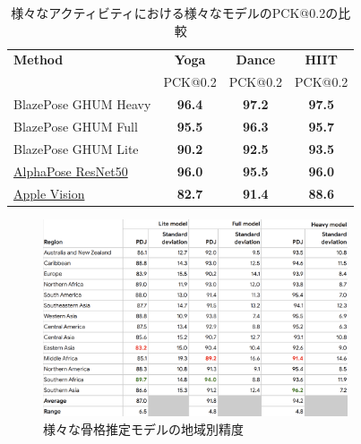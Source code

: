   \begin{table}[ht]
    \centering
    \begin{tabular}{|l|c|c|c|}
    \hline
    \textbf{Method} & \textbf{Yoga} & \textbf{Dance} & \textbf{HIIT} \\
                    & PCK@0.2       & PCK@0.2        & PCK@0.2       \\ 
    \hline
    BlazePose GHUM Heavy                                                      & \textbf{96.4} & \textbf{97.2} & \textbf{97.5} \\
    BlazePose GHUM Full                                                       & \textbf{95.5} & \textbf{96.3} & \textbf{95.7} \\
    BlazePose GHUM Lite                                                       & \textbf{90.2} & \textbf{92.5} & \textbf{93.5} \\
    \href{https://github.com/MVIG-SJTU/AlphaPose}{AlphaPose ResNet50}         & \textbf{96.0} & \textbf{95.5} & \textbf{96.0} \\
    \href{https://developer.apple.com/documentation/vision/detecting_human_body_poses_in_images}{Apple Vision} & \textbf{82.7} & \textbf{91.4} & \textbf{88.6} \\
    \hline
    \end{tabular}
    \caption{様々なアクティビティにおける様々なモデルのPCK@0.2の比較 \cite{pose-estimation-quality}}
    \label{tab:pose-estimation-quality}
  \end{table}
    
  \begin{figure}[H]
    \begin{center}
    \includegraphics[width=9cm]{figures/Model_Accuracy_by_Race.png}
    \caption{様々な骨格推定モデルの地域別精度 \cite{Model-Accuracy-by-Race}}
    \label{fig:Model-Accuracy-by-Race}
    \end{center}
  \end{figure}


